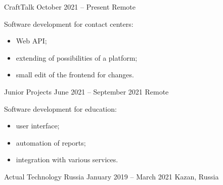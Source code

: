 \documentclass[10pt,a4paper,ragged2e,withhyper]{altacv}
\begin{document}

\makecvheader



\begin{paracol}{2}


{CraftTalk}
{October 2021 -- Present}
{Remote}

Software development for contact centers:

\begin{itemize}

  \item Web API;
  \smallskip

  \item extending of possibilities of a platform;
  \smallskip

  \item small edit of the frontend for changes.

\end{itemize}

\divider

{Junior Projects}
{June 2021 -- September 2021}
{Remote}

Software development for education:

\begin{itemize}

  \item user interface;
  \smallskip

  \item automation of reports;
  \smallskip

  \item integration with various services.

\end{itemize}

\divider

{Actual Technology Russia}
{January 2019 -- March 2021}
{Kazan, Russia}


\end{paracol}
\end{document}
